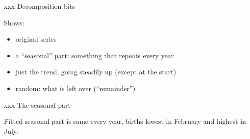 \documentclass[ignorenonframetext,]{beamer}
\newenvironment{Shaded}{\begin{snugshade}}{\end{snugshade}}
\newcommand{\NormalTok}[1]{#1}
\newcommand{\OperatorTok}[1]{\textcolor[rgb]{0.81,0.36,0.00}{\textbf{#1}}}
\providecommand{\tightlist}{%
  \setlength{\itemsep}{0pt}\setlength{\parskip}{0pt}}
\begin{document}
\begin{frame}{xxx Decomposition bits}
\protect\hypertarget{xxx-decomposition-bits}{}

Shows:

\begin{itemize}
\tightlist
\item
  original series
\item
  a ``seasonal'' part: something that repeats every year
\item
  just the trend, going steadily up (except at the start)
\item
  random: what is left over (``remainder'')
\end{itemize}

\end{frame}

\begin{frame}[fragile]{xxx The seasonal part}
\protect\hypertarget{xxx-the-seasonal-part}{}

Fitted seasonal part is same every year, births lowest in February and
highest in July:

\begin{Shaded}
\end{Shaded}


\end{frame}
\end{document}
